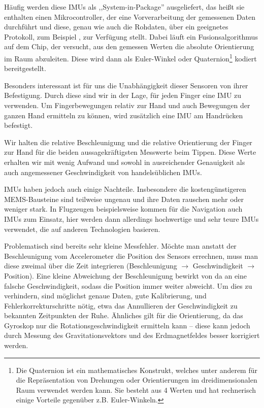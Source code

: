 Häufig werden diese IMUs als ,,System-in-Package'' ausgeliefert, das heißt sie
enthalten einen Mikrocontroller, der eine Vorverarbeitung der gemessenen Daten
durchführt und diese, genau wie auch die Rohdaten, über ein geeignetes
Protokoll, zum Beispiel \iic, zur Verfügung stellt. Dabei läuft ein
Fusionsalgorithmus auf dem Chip, der versucht, aus den gemessen Werten die
absolute Orientierung im Raum abzuleiten. Diese wird dann als Euler-Winkel oder
Quaternion\footnote{Die Quaternion ist ein mathematisches Konstrukt, welches
unter anderem für die Repräsentation von Drehungen oder Orientierungen im
dreidimensionalen Raum verwendet werden kann. Sie besteht aus 4 Werten und hat
rechnerisch einige Vorteile gegenüber z.B. Euler-Winkeln.} kodiert
bereitgestellt.

Besonders interessant ist für uns die Unabhängigkeit dieser Sensoren von ihrer
Befestigung. Durch diese sind wir in der Lage, für jeden Finger eine IMU zu
verwenden. Um Fingerbewegungen relativ zur Hand und auch Bewegungen der ganzen
Hand ermitteln zu können, wird zusätzlich eine IMU am Handrücken befestigt.

Wir halten die relative Beschleunigung und die relative Orientierung der Finger
zur Hand für die beiden aussagekräftigsten Messwerte beim Tippen. Diese Werte
erhalten wir mit wenig Aufwand und sowohl in ausreichender Genauigkeit als auch
angemessener Geschwindigkeit von handelsüblichen IMUs.

IMUs haben jedoch auch einige Nachteile. Insbesondere die kostengünstigeren
MEMS-Bausteine sind teilweise ungenau und ihre Daten rauschen mehr oder weniger
stark. In Flugzeugen beispielsweise kommen für die Navigation auch IMUs zum
Einsatz, hier werden dann allerdings hochwertige und sehr teure IMUs verwendet,
die auf anderen Technologien basieren.

Problematisch sind bereits sehr kleine Messfehler. Möchte man anstatt der
Beschleunigung vom Accelerometer die Position des Sensors errechnen, muss man
diese zweimal über die Zeit integrieren (Beschleunigung $\rightarrow$
Geschwindigkeit $\rightarrow$ Position). Eine kleine Abweichung der
Beschleunigung bewirkt von da an eine falsche Geschwindigkeit, sodass die
Position immer weiter abweicht. Um dies zu verhindern, sind möglichst genaue
Daten, gute Kalibrierung, und Fehlerkorrekturschritte nötig, etwa das
Annullieren der Geschwindigkeit zu bekannten Zeitpunkten der Ruhe. Ähnliches
gilt für die Orientierung, da das Gyroskop nur die Rotationsgeschwindigkeit
ermitteln kann -- diese kann jedoch durch Messung des Gravitationsvektors und
des Erdmagnetfeldes besser korrigiert werden.


